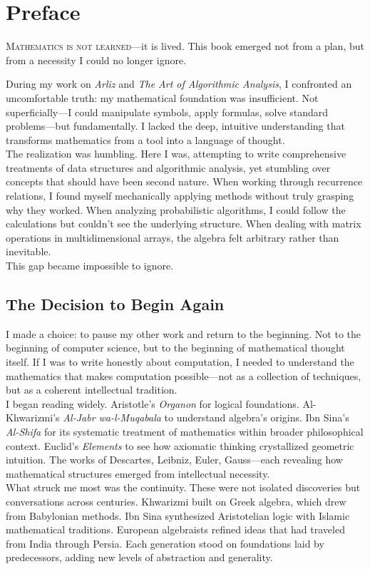 \chapter*{Preface}

\lettrine{M}{athematics is not learned}—it is lived. This book emerged not from a plan, but from a necessity I could no longer ignore.

During my work on \textit{Arliz} and \textit{The Art of Algorithmic Analysis}, I confronted an uncomfortable truth: my mathematical foundation was insufficient. Not superficially—I could manipulate symbols, apply formulas, solve standard problems—but fundamentally. I lacked the deep, intuitive understanding that transforms mathematics from a tool into a language of thought.\\
The realization was humbling. Here I was, attempting to write comprehensive treatments of data structures and algorithmic analysis, yet stumbling over concepts that should have been second nature. When working through recurrence relations, I found myself mechanically applying methods without truly grasping why they worked. When analyzing probabilistic algorithms, I could follow the calculations but couldn't see the underlying structure. When dealing with matrix operations in multidimensional arrays, the algebra felt arbitrary rather than inevitable.\\
This gap became impossible to ignore.

\section*{The Decision to Begin Again}

I made a choice: to pause my other work and return to the beginning. Not to the beginning of computer science, but to the beginning of mathematical thought itself. If I was to write honestly about computation, I needed to understand the mathematics that makes computation possible—not as a collection of techniques, but as a coherent intellectual tradition.\\
I began reading widely. Aristotle's \textit{Organon} for logical foundations. Al-Khwarizmi's \textit{Al-Jabr wa-l-Muqabala} to understand algebra's origins. Ibn Sina's \textit{Al-Shifa} for its systematic treatment of mathematics within broader philosophical context. Euclid's \textit{Elements} to see how axiomatic thinking crystallized geometric intuition. The works of Descartes, Leibniz, Euler, Gauss—each revealing how mathematical structures emerged from intellectual necessity.\\
What struck me most was the continuity. These were not isolated discoveries but conversations across centuries. Khwarizmi built on Greek algebra, which drew from Babylonian methods. Ibn Sina synthesized Aristotelian logic with Islamic mathematical traditions. European algebraists refined ideas that had traveled from India through Persia. Each generation stood on foundations laid by predecessors, adding new levels of abstraction and generality.

